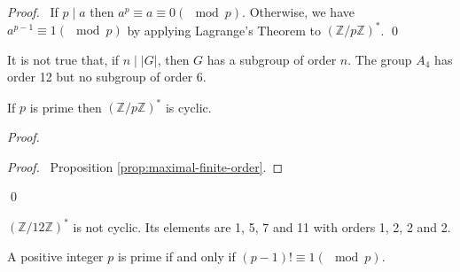 \begin{proof}
\pf\ If $p \mid a$ then $a^p \equiv a \equiv 0 (\mod p)$. Otherwise, we have $a^{p-1} \equiv 1 (\mod p)$ by applying Lagrange's Theorem to $(\mathbb{Z} / p \mathbb{Z})^*$. \qed
\end{proof}

\begin{ex}
It is not true that, if $n \mid |G|$, then $G$ has a subgroup of order $n$. The group $A_4$ has order 12 but no subgroup of order 6.
\end{ex}

\begin{prop}
    If $p$ is prime then $(\mathbb{Z} / p \mathbb{Z})^*$ is cyclic.
\end{prop}

\begin{proof}
    \pf
    \begin{proof}
        \pf\ Proposition \ref{prop:maximal-finite-order}.
    \end{proof}
    \qed
\end{proof}

\begin{ex}
    $(\mathbb{Z} / 12 \mathbb{Z})^*$ is not cyclic. Its elements are 1, 5, 7 and 11 with orders 1, 2, 2 and 2.
\end{ex}

\begin{thm}
    A positive integer $p$ is prime if and only if $(p-1)! \equiv 1 (\mod p)$.
\end{thm}

